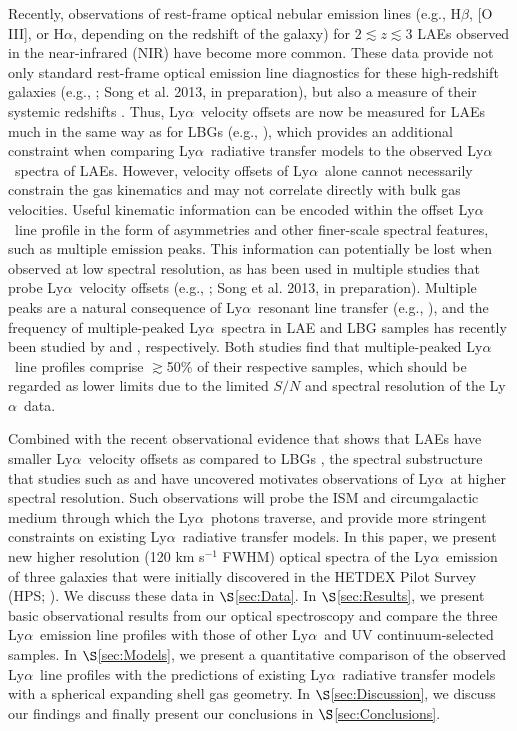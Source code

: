 \documentclass{emulateapj}
\newcommand{\lya}{Ly$\alpha$}
\newcommand{\ha}{H$\alpha$}
\newcommand{\hb}{H$\beta$}
\newcommand{\oiii}{[O III]}
\begin{document}
Recently, observations of rest-frame optical nebular emission lines (e.g., \hb, \oiii, or \ha, depending on the redshift of the galaxy) for $2 \lesssim z \lesssim 3$ LAEs observed in the near-infrared (NIR) have become more common. These data provide not only standard rest-frame optical emission line diagnostics for these high-redshift galaxies (e.g., \citealp{finkelstein2011,song2013}; Song et al. 2013, in preparation), but also a measure of their systemic redshifts \citep{mclinden2011,hashimoto2012,guaita2013}. Thus, \lya\ velocity offsets are now be measured for LAEs much in the same way as for LBGs (e.g., \citealp{steidel2010,kulas2012}), which provides an additional constraint when comparing \lya\ radiative transfer models to the observed \lya\ spectra of LAEs. However, velocity offsets of \lya\ alone cannot necessarily constrain the gas kinematics and may not correlate directly with bulk gas velocities. Useful kinematic information can be encoded within the offset \lya\ line profile in the form of asymmetries and other finer-scale spectral features, such as multiple emission peaks. This information can potentially be lost when observed at low spectral resolution, as has been used in multiple studies that probe \lya\ velocity offsets (e.g., \citealp{finkelstein2011,mclinden2011,kulas2012,guaita2013}; Song et al. 2013, in preparation). Multiple peaks are a natural consequence of \lya\ resonant line transfer (e.g., \citealp{neufeld1990}), and the frequency of multiple-peaked \lya\ spectra in LAE and LBG samples has recently been studied by \citet{yamada2012} and \citet{kulas2012}, respectively. Both studies find that multiple-peaked \lya\ line profiles comprise $\gtrsim$50\% of their respective samples, which should be regarded as lower limits due to the limited $S/N$ and spectral resolution of the \lya\ data. 

Combined with the recent observational evidence that shows that LAEs have smaller \lya\ velocity offsets as compared to LBGs \citep{hashimoto2012}, the spectral substructure that studies such as \citet{yamada2012} and \citet{kulas2012} have uncovered motivates observations of \lya\ at higher spectral resolution. Such observations will probe the ISM and circumgalactic medium through which the \lya\ photons traverse, and provide more stringent constraints on existing \lya\ radiative transfer models. In this paper, we present new higher resolution (120 km s$^{-1}$ FWHM) optical spectra of the \lya\ emission of three galaxies that were initially discovered in the HETDEX Pilot Survey (HPS; \citealp{adams2011}). We discuss these data in $\S$\ref{sec:Data}. In $\S$\ref{sec:Results}, we present basic observational results from our optical spectroscopy and compare the three \lya\ emission line profiles with those of other \lya\ and UV continuum-selected samples. In $\S$\ref{sec:Models}, we present a quantitative comparison of the observed \lya\ line profiles with the predictions of existing \lya\ radiative transfer models with a spherical expanding shell gas geometry. In $\S$\ref{sec:Discussion}, we discuss our findings and finally present our conclusions in $\S$\ref{sec:Conclusions}. 
\end{document}
